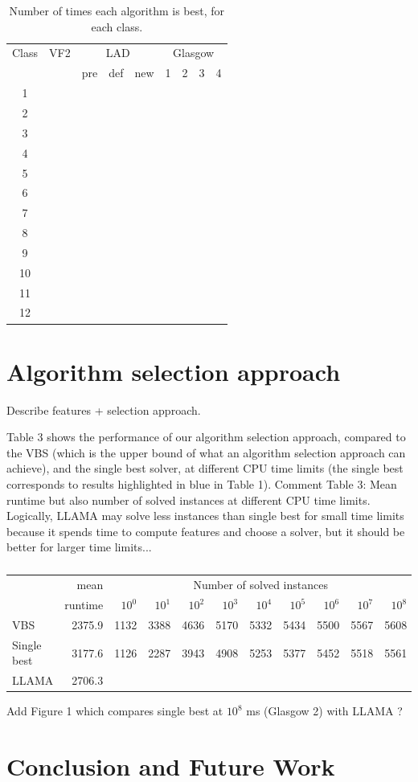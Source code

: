 \documentclass{llncs}
\begin{document}
\begin{table}
\begin{center}
\begin{tabular}{|c||r||r|r|r||r|r|r|r|}
\hline
Class & VF2 & \multicolumn{3}{c||}{LAD} & \multicolumn{4}{c|}{Glasgow}\\
&&pre&def&new&1&2&3&4\\\hline
1\\\hline
2\\\hline
3\\\hline
4\\\hline
5\\\hline
6\\\hline
7\\\hline
8\\\hline
9\\\hline
10\\\hline
11\\\hline
12\\\hline

\end{tabular}
\end{center}
\caption{Number of times each algorithm is best, for each class.\label{expClass}}
\end{table}

\section{Algorithm selection approach}

Describe features + selection approach.

Table 3 shows the performance of our algorithm selection approach, compared to the VBS (which is the
upper bound of what an algorithm selection approach can achieve), and the single best solver, at
different CPU time limits (the single best corresponds to results highlighted in blue in Table 1).
Comment Table 3: Mean runtime but also number of solved instances at different CPU time limits.
Logically, LLAMA may solve less instances than single best for small time limits because it spends
time to compute features and choose a solver, but it should be better for larger time limits...

\begin{table}
\begin{tabular}{|l|r|rrrrrrrrr|}
&mean & \multicolumn{9}{c|}{Number of solved instances}\\
&runtime & $10^0$ &  $10^1$ &  $10^2$ &  $10^3$ &  $10^4$ &  $10^5$ &  $10^6$ &  $10^7$ &  $10^8$\\\hline
VBS & 2375.9 & 1132 & 3388 & 4636 & 5170 & 5332 & 5434 & 5500 & 5567 & 5608\\\hline
Single best & 3177.6 & 1126 & 2287 & 3943 & 4908 & 5253 & 5377 & 5452 & 5518 & 5561\\\hline
LLAMA & 2706.3\\\hline
\end{tabular}
\caption{}
\end{table}

Add Figure 1 which compares single best at $10^8$ ms (Glasgow 2) with LLAMA ?

\section{Conclusion and Future Work}




\end{document}

